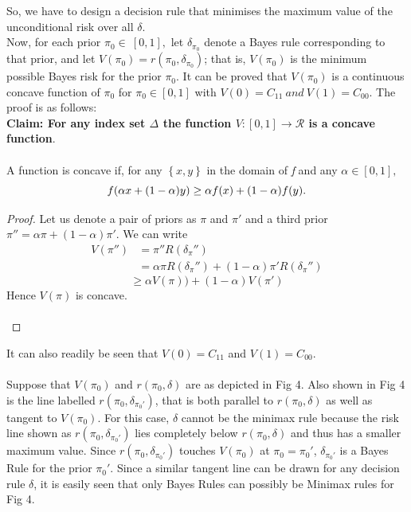 \documentclass[a4paper,english,12pt]{article}
\begin{document}
So, we have to design a decision rule that minimises the maximum value of the unconditional risk over all $\delta$.\\ 
Now, for each prior $\pi_0 \in~[0,1],$ let $\delta_{\pi_0}$ denote a Bayes rule corresponding to that prior, and let $V(\pi_0) = r(\pi_0,\delta_{\pi_0}) $; that is, $V(\pi_0)$ is the minimum possible Bayes risk for the prior $\pi_0$.
It can be proved that $V(\pi_0)$ is a continuous concave function of $\pi_0$ for $\pi_0 \in [0,1]$ with $V(0)=C_{11} ~and~ V(1)=C_{00}$. The proof is as follows:\\
\textbf{Claim: For any index set $\Delta$ the function \textbf{$V:[0,1] \to\mathcal R$} is a concave function}.\\ \\
A function is concave if, for any $\left\lbrace x,y\right\rbrace$ in the domain of \textit{f} and any $\alpha  \in [0,1],$
\begin{equation}
f(\alpha x + (1 - \alpha )y) \ge \alpha f(x) + (1 - \alpha )f(y).\\
\end{equation}
\begin{proof}
	 Let us denote a pair of priors as $\pi$ and $\pi'$ and a third prior $\pi''  = \alpha \pi  + (1 - \alpha )\pi'$.
We can write\\
\begin{align}
V(\pi'' ) &= \pi'' R({\delta _\pi'' })\\ \nonumber
&=\alpha \pi R({\delta _\pi'' }) + (1 - \alpha )\pi' R({\delta _\pi ''})
\end{align}
\begin{equation}
\ge \alpha V(\pi )) + (1 - \alpha )V(\pi' )
\end{equation}
Hence $V(\pi)$ is concave.\\ \\
\end{proof}
It can also readily be seen that $V(0)=C_{11}$ and $V(1)=C_{00}$.\\ \\
Suppose that $V(\pi_0)$ and $r(\pi_0,\delta)$ are as depicted in Fig 4. Also shown in Fig 4 is the line labelled $r({\pi _0},{\delta _{{\pi _0'}}})$, that is both parallel to $r({\pi _0},{\delta})$ as well as tangent to $V(\pi_0)$. For this case, $\delta$ cannot be the minimax rule because the risk line shown as $r({\pi _0},{\delta _{{\pi _0'}}})$  lies completely below $r({\pi _0},{\delta})$ and thus has a smaller maximum value. Since $r({\pi _0},{\delta _{{\pi _0'}}})$ touches $V(\pi_0)$ at $\pi_0 = \pi_0'$, $\delta _{{\pi _0'}}$ is a Bayes Rule for the prior $\pi_0'$. Since a similar tangent line can be drawn for any decision rule $\delta$, it is easily seen that only Bayes Rules can possibly be Minimax rules for Fig 4. \\
\end{document}
